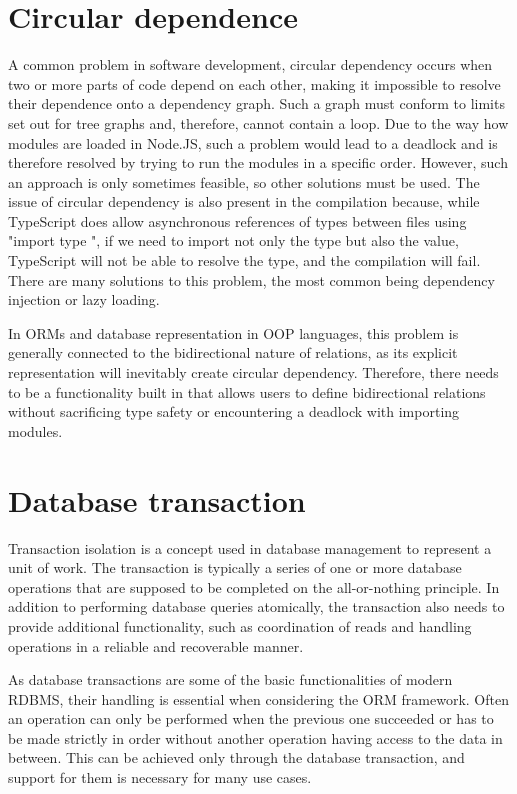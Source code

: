 \section{Circular dependence}
A common problem in software development, circular dependency occurs when two or more parts of code depend on each other, making it impossible to resolve their dependence onto a dependency graph. Such a graph must conform to limits set out for tree graphs and, therefore, cannot contain a loop. Due to the way how modules are loaded in Node.JS, such a problem would lead to a deadlock and is therefore resolved by trying to run the modules in a specific order. However, such an approach is only sometimes feasible, so other solutions must be used. The issue of circular dependency is also present in the compilation because, while TypeScript does allow asynchronous references of types between files using "import type ", if we need to import not only the type but also the value, TypeScript will not be able to resolve the type, and the compilation will fail. There are many solutions to this problem, the most common being dependency injection or lazy loading.\par
In ORMs and database representation in OOP languages, this problem is generally connected to the bidirectional nature of relations, as its explicit representation will inevitably create circular dependency. Therefore, there needs to be a functionality built in that allows users to define bidirectional relations without sacrificing type safety or encountering a deadlock with importing modules. \par

\section{Database transaction}
Transaction isolation is a concept used in database management to represent a unit of work. The transaction is typically a series of one or more database operations that are supposed to be completed on the all-or-nothing principle. In addition to performing database queries atomically, the transaction also needs to provide additional functionality, such as coordination of reads and handling operations in a reliable and recoverable manner. \par
As database transactions are some of the basic functionalities of modern RDBMS, their handling is essential when considering the ORM framework. Often an operation can only be performed when the previous one succeeded or has to be made strictly in order without another operation having access to the data in between. This can be achieved only through the database transaction, and support for them is necessary for many use cases.\par

